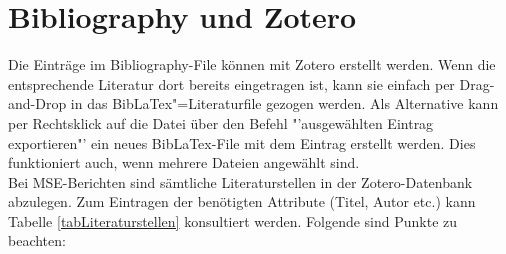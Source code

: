 %
\section{Bibliography und Zotero}%
%
Die Einträge im Bibliography-File können mit Zotero erstellt werden. Wenn die entsprechende Literatur dort bereits eingetragen ist, kann sie einfach per Drag-and-Drop in das BibLaTex"=Literaturfile gezogen werden. Als Alternative kann per Rechtsklick auf die Datei über den Befehl "'ausgewählten Eintrag exportieren"' ein neues BibLaTex-File mit dem Eintrag erstellt werden. Dies funktioniert auch, wenn mehrere Dateien angewählt sind.\\%
%
Bei MSE-Berichten sind sämtliche Literaturstellen in der Zotero-Datenbank abzulegen. Zum Eintragen der benötigten Attribute (Titel, Autor etc.) kann Tabelle \ref{tabLiteraturstellen} konsultiert werden. Folgende sind Punkte zu beachten:%
%

